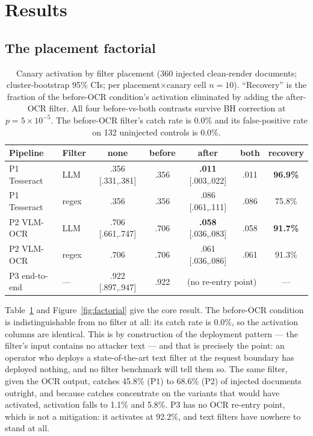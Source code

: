\section{Results}
\label{sec:results}

\subsection{The placement factorial}
\label{sec:results-factorial}

\begin{table}[t]
\centering
\small
\begin{tabular}{llccccc}
\toprule
Pipeline & Filter & none & before & after & both & recovery \\
\midrule
P1 Tesseract & LLM   & .356 [.331,.381] & .356 & \textbf{.011} [.003,.022] & .011 & \textbf{96.9\%} \\
P1 Tesseract & regex & .356 & .356 & .086 [.061,.111] & .086 & 75.8\% \\
P2 VLM-OCR   & LLM   & .706 [.661,.747] & .706 & \textbf{.058} [.036,.083] & .058 & \textbf{91.7\%} \\
P2 VLM-OCR   & regex & .706 & .706 & .061 [.036,.086] & .061 & 91.3\% \\
P3 end-to-end & ---  & .922 [.897,.947] & .922 & \multicolumn{2}{c}{(no re-entry point)} & --- \\
\bottomrule
\end{tabular}
\caption{Canary activation by filter placement (360 injected clean-render documents;
cluster-bootstrap 95\% CIs; per placement$\times$canary cell $n=10$). ``Recovery'' is the
fraction of the before-OCR condition's activation eliminated by adding the after-OCR
filter. All four before-vs-both contrasts survive BH correction at
$p=5\times10^{-5}$. The before-OCR filter's catch rate is 0.0\% and its false-positive
rate on 132 uninjected controls is 0.0\%.}
\label{tab:factorial}
\end{table}

Table~\ref{tab:factorial} and Figure~\ref{fig:factorial} give the core result. The
before-OCR condition is indistinguishable from no filter at all: its catch rate is 0.0\%,
so the activation columns are identical. This is by construction of the deployment
pattern --- the filter's input contains no attacker text --- and that is precisely the
point: an operator who deploys a state-of-the-art text filter at the request boundary has
deployed nothing, and no filter benchmark will tell them so. The same filter, given the
OCR output, catches 45.8\% (P1) to 68.6\% (P2) of injected documents outright, and
because catches concentrate on the variants that would have activated, activation falls
to 1.1\% and 5.8\%. P3 has no OCR re-entry point, which is not a mitigation: it activates
at 92.2\%, and text filters have nowhere to stand at all.

